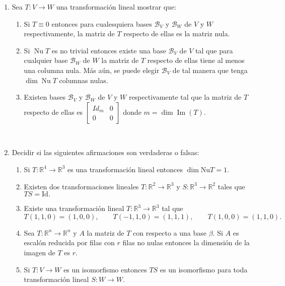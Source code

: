 \documentclass[11pt,spanish,makeidx]{amsbook}
\newcommand\im{\operatorname{Im}}
\renewcommand\nu{\operatorname{Nu}}
\newcommand\R{\mathbb{R}}
\newcommand\B {\mathcal{B}}
\begin{document}
\begin{enumerate}
	\
	
	\item Sea $T:V \to W$ una transformaci\'on lineal mostrar que:
	\begin{enumerate}
		\item Si $T \equiv 0$ entonces para cualesquiera bases $\B_V$ y $\B_W$ de $V$ y $W$ respectivamente, la matriz de $T$ respecto de ellas es la matriz nula.
		\item Si $\nu T$ es no trivial entonces existe una base $\B_V$ de $V$ tal que para cualquier base $\B_W$ de $W$ la matriz de $T$ respecto de ellas tiene al menos una columna nula. M\'as a\'un, se puede elegir $\B_V$ de tal manera que tenga $\dim \nu T$ columnas nulas.
		\item Existen bases $\B_V$ y $\B_W$ de $V$ y $W$ respectivamente tal que la matriz de $T$ respecto de ellas es $\begin{bmatrix}
		Id_m& 0\\
		0&0
		\end{bmatrix} $ donde $m=\dim \im(T)$.
	\end{enumerate}
		
%	
%		
%	
%		
%	
%		
	\
	
	\item Decidir si las siguientes afirmaciones son verdaderas o falsas:
	\begin{enumerate}
		\item Si $T:\R^4 \to \R^3$ es una transformaci\'on lineal entonces $\dim \text{Nu} T = 1.$
		\item Existen dos transformaciones lineales  $T:\R^2 \to \R^3$ y $S:\R^3 \to \R^2$ tales que  $TS = \text{Id}.$
		\item Existe una transformaci\'on lineal $T:\R^3 \to \R^3$ tal que
		$$ T(1,1,0)=(1,0,0), \qquad T(-1,1,0)=(1,1,1), \qquad T(1,0,0)=(1,1,0).$$
		\item Sea $T:\R^n \to \R^n$ y $A$ la matriz de $T$ con respecto a una base $\beta.$ Si $A$ es escal\'on reducida por filas con $r$ filas no nulas
		entonces la dimensi\'on de la imagen de $T$ es $r$.
		\item Si $T:V \to W$ es un isomorfismo entonces $TS$ es un isomorfismo para toda transformaci\'on lineal $S:W \to W.$
	\end{enumerate}

	
	
\end{enumerate}
\end{document}
